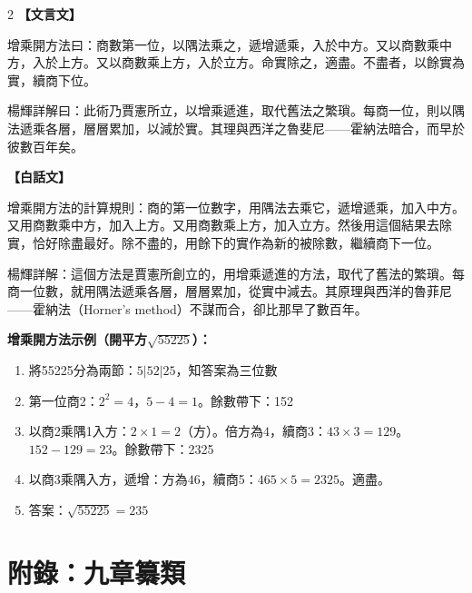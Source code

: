 \documentclass[11pt,a4paper]{article}
\newcommand{\zhc}{}[1]{{\CJKfamily{\CJKrmdefault}#1}}  %
\newcommand{\zhm}[1]{{\CJKfamily{\CJKrmdefault}#1}}  %
\newenvironment{prob bilingual}[1][]{%
  \begin{paracol}{2}%
  \setlength{\columnseprule}{0.4pt}%
}{%
  \end{paracol}%
  \medskip%
}
\begin{document}
\begin{paracol}{2}
\switchcolumn[0]
\noindent\textbf{\textcolor{notecolor}{\zhc{【文言文】}}}\par\smallskip
\zhc{
增乘開方法曰：商數第一位，以隅法乘之，遞增遞乘，入於中方。又以商數乘中方，入於上方。又以商數乘上方，入於立方。命實除之，適盡。不盡者，以餘實為實，續商下位。

楊輝詳解曰：此術乃賈憲所立，以增乘遞進，取代舊法之繁瑣。每商一位，則以隅法遞乘各層，層層累加，以減於實。其理與西洋之魯斐尼——霍納法暗合，而早於彼數百年矣。
}

\switchcolumn[1]
\noindent\textbf{\textcolor{notecolor}{\zhm{【白話文】}}}\par\smallskip
\zhm{
增乘開方法的計算規則：商的第一位數字，用隅法去乘它，遞增遞乘，加入中方。又用商數乘中方，加入上方。又用商數乘上方，加入立方。然後用這個結果去除實，恰好除盡最好。除不盡的，用餘下的實作為新的被除數，繼續商下一位。

楊輝詳解：這個方法是賈憲所創立的，用增乘遞進的方法，取代了舊法的繁瑣。每商一位數，就用隅法遞乘各層，層層累加，從實中減去。其原理與西洋的魯菲尼——霍納法（Horner's method）不謀而合，卻比那早了數百年。
}
\end{paracol}

\medskip

\noindent\textbf{\textcolor{sectioncolor}{\zhc{增乘開方法示例（開平方$\sqrt{55225}$）：}}}

\begin{enumerate}[leftmargin=2em]
  \item 將55225分為兩節：$5|52|25$，知答案為三位數
  \item 第一位商2：$2^2 = 4$，$5 - 4 = 1$。餘數帶下：152
  \item 以商2乘隅1入方：$2 \times 1 = 2$（方）。倍方為$4$，續商3：$43 \times 3 = 129$。$152 - 129 = 23$。餘數帶下：2325
  \item 以商3乘隅入方，遞增：方為$46$，續商5：$465 \times 5 = 2325$。適盡。
  \item 答案：$\sqrt{55225} = 235$
\end{enumerate}

\newpage

\section*{\zhc{附錄：九章纂類}}
\end{document}
